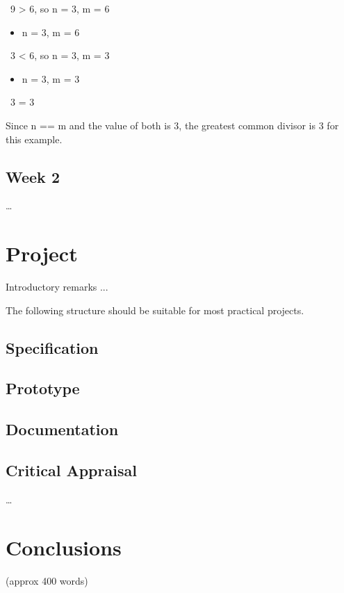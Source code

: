 \documentclass{article}
\theoremstyle{theorem}
\theoremstyle{definition}
\theoremstyle{remark}
\begin{document}
\medskip\indent\indent\
9 \textgreater{} 6, so n = 3, m = 6

\begin{itemize}
\item n = 3, m = 6
\end{itemize}

\medskip\indent\indent\
3 \textless{} 6, so n = 3, m = 3

\begin{itemize}
\item n = 3, m = 3
\end{itemize}

\medskip\indent\indent\
3 = 3

\medskip\noindent
Since n == m and the value of both is 3, the greatest common divisor is 3 for this example.


\subsection{Week 2}

\ldots

\section{Project}

Introductory remarks ...

The following structure should be suitable for most practical projects. 

\subsection{Specification}
\subsection{Prototype}
\subsection{Documentation}
\subsection{Critical Appraisal}

\ldots

\section{Conclusions}\label{conclusions}

(approx 400 words)
\end{document}
